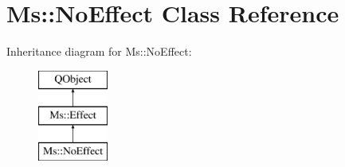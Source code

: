 \hypertarget{class_ms_1_1_no_effect}{}\section{Ms\+:\+:No\+Effect Class Reference}
\label{class_ms_1_1_no_effect}
Inheritance diagram for Ms\+:\+:No\+Effect\+:\begin{figure}[H]
\begin{center}
\leavevmode
\includegraphics[height=3.000000cm]{class_ms_1_1_no_effect}
\end{center}
\end{figure}
